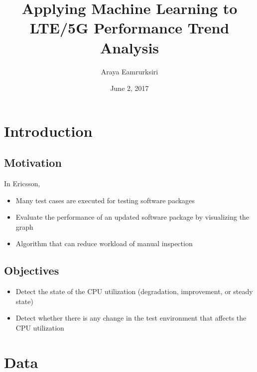 \documentclass{beamer}
\title[Master Thesis]{Applying Machine Learning to LTE/5G Performance Trend Analysis} %
\author{Araya Eamrurksiri}
\institute[LiU] %
{
	Linkoping university \\ %
	\medskip
	\textit{} %
}
\date{June 2, 2017}
\begin{document}
	
\begin{frame}
	\titlepage %
\end{frame}



\section{Introduction} 
\subsection{Motivation}
\begin{frame}
In Ericsson,

\begin{itemize}
	\item Many test cases are executed for testing software packages 
	\item Evaluate the performance of an updated software package by visualizing the graph 
	\item Algorithm that can reduce workload of manual inspection
\end{itemize}	

\end{frame}
\subsection{Objectives}
\begin{frame}
\begin{itemize}
	\item Detect the state of the CPU utilization (degradation, improvement, or steady state)
	\item Detect whether there is any change in the test environment that affects the CPU utilization
\end{itemize}
\end{frame}

\section{Data}
\end{document}

